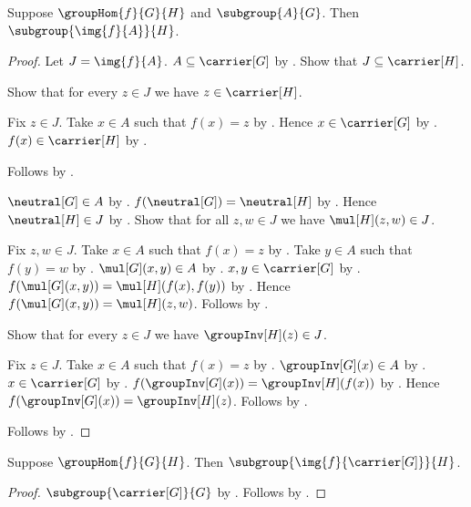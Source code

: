 \begin{theorem}\label{group_hom_subgroup_image}
    Suppose $\groupHom{f}{G}{H}$ and $\subgroup{A}{G}$.
    Then $\subgroup{\img{f}{A}}{H}$.
\end{theorem}
\begin{proof}
    Let $J=\img{f}{A}$.
    $A\subseteq\carrier[G]$ by .
    Show that $J\subseteq\carrier[H]$.
    \begin{subproof}
        Show that for every $z\in J$ we have $z\in\carrier[H]$.
        \begin{subproof}
            Fix $z\in J$.
            Take $x\in A$ such that $f(x)=z$ by
                .
            Hence $x\in\carrier[G]$ by .
            $f(x)\in\carrier[H]$ by
                .
        \end{subproof}
        Follows by .
    \end{subproof}
    $\neutral[G]\in A$ by .
    $f(\neutral[G])=\neutral[H]$ by
        .
    Hence $\neutral[H]\in J$ by
        .
    Show that for all $z,w\in J$ we have $\mul[H](z,w)\in J$.
    \begin{subproof}
        Fix $z,w\in J$.
        Take $x\in A$ such that $f(x)=z$ by
            .
        Take $y\in A$ such that $f(y)=w$ by
            .
        $\mul[G](x,y)\in A$ by .
        $x,y\in\carrier[G]$ by .
        $f(\mul[G](x,y))=\mul[H](f(x),f(y))$ by
            .
        Hence $f(\mul[G](x,y))=\mul[H](z,w)$.
        Follows by .
    \end{subproof}
    Show that for every $z\in J$ we have $\groupInv[H](z)\in J$.
    \begin{subproof}
        Fix $z\in J$.
        Take $x\in A$ such that $f(x)=z$ by
            .
        $\groupInv[G](x)\in A$ by .
        $x\in\carrier[G]$ by .
        $f(\groupInv[G](x))=\groupInv[H](f(x))$ by
            .
        Hence $f(\groupInv[G](x))=\groupInv[H](z)$.
        Follows by .
    \end{subproof}
    Follows by .
\end{proof}

\begin{corollary}\label{group_hom_image_subgroup}
    Suppose $\groupHom{f}{G}{H}$.
    Then $\subgroup{\img{f}{\carrier[G]}}{H}$.
\end{corollary}
\begin{proof}
    $\subgroup{\carrier[G]}{G}$ by
        .
    Follows by .
\end{proof}

